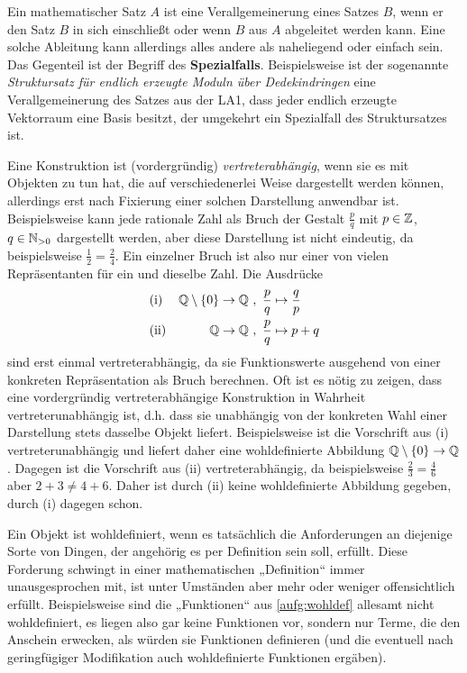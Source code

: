 \begin{description}[labelindent=0pt, leftmargin=0pt]
    \item[Verallgemeinerung:] Ein mathematischer Satz $A$ ist eine Verallgemeinerung eines Satzes $B$, wenn er den Satz $B$ in sich einschließt oder wenn $B$ aus $A$ abgeleitet werden kann. Eine solche Ableitung kann allerdings alles andere als naheliegend oder einfach sein. Das Gegenteil ist der Begriff des \textbf{Spezialfalls}. Beispielsweise ist der sogenannte \emph{Struktursatz für endlich erzeugte Moduln über Dedekindringen} eine Verallgemeinerung des Satzes aus der LA1, dass jeder endlich erzeugte Vektorraum eine Basis besitzt, der umgekehrt ein Spezialfall des Struktursatzes ist.
    
    \item[Vertreterabhängig:] Eine Konstruktion ist (vordergründig) \emph{vertreterabhängig}, wenn sie es mit Objekten zu tun hat, die auf verschiedenerlei Weise dargestellt werden können, allerdings erst nach Fixierung einer solchen Darstellung anwendbar ist. Beispielsweise kann jede rationale Zahl als Bruch der Gestalt $\frac{p}{q}$ mit $p\in \mathbb Z$, $q\in \mathbb N_{>0}$ dargestellt werden, aber diese Darstellung ist nicht eindeutig, da beispielsweise $\frac{1}{2}=\frac{2}{4}$. Ein einzelner Bruch ist also nur einer von vielen Repräsentanten für ein und dieselbe Zahl. Die Ausdrücke
    \begin{align*}
        &\text{(i)} & \Q\setminus \{0\} \to \Q \ & ,\ \frac{p}{q} \mapsto \frac{q}{p} \\
        &\text{(ii)} & \Q \to \Q \ & ,\ \frac{p}{q} \mapsto p+q
    \end{align*}
    sind erst einmal vertreterabhängig, da sie Funktionswerte ausgehend von einer konkreten Repräsentation als Bruch berechnen. Oft ist es nötig zu zeigen, dass eine vordergründig vertreterabhängige Konstruktion in Wahrheit vertreterunabhängig ist, d.h. dass sie unabhängig von der konkreten Wahl einer Darstellung stets dasselbe Objekt liefert. Beispielsweise ist die Vorschrift aus (i) vertreterunabhängig und liefert daher eine wohldefinierte Abbildung $\mathbb Q\setminus \{0\}\to \mathbb Q$. Dagegen ist die Vorschrift aus (ii) vertreterabhängig, da beispielsweise $\frac{2}{3}=\frac{4}{6}$ aber $2+3\neq 4+6$. Daher ist durch (ii) keine wohldefinierte Abbildung gegeben, durch (i) dagegen schon.
    
    \item[Wohldefiniert:] Ein Objekt ist wohldefiniert, wenn es tatsächlich die Anforderungen an diejenige Sorte von Dingen, der angehörig es per Definition sein soll, erfüllt. Diese Forderung schwingt in einer mathematischen „Definition“ immer unausgesprochen mit, ist unter Umständen aber mehr oder weniger offensichtlich erfüllt. Beispielsweise sind die „Funktionen“ aus \cref{aufg:wohldef} allesamt nicht wohldefiniert, es liegen also gar keine Funktionen vor, sondern nur Terme, die den Anschein erwecken, als würden sie Funktionen definieren (und die eventuell nach geringfügiger Modifikation auch wohldefinierte Funktionen ergäben).
    
\end{description}
